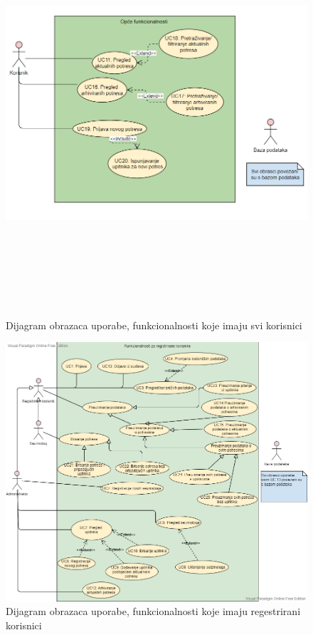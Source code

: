 				\begin{figure}[H]
					\includegraphics[width=\textwidth, height = 15cm]{slike/prvinovi.PNG} 
					 \caption{Dijagram obrazaca uporabe, funkcionalnosti koje imaju svi korisnici}
					  \label{fig:obrasci1} 
				  \end{figure}
				  
				  \begin{figure}[H]
					\includegraphics[width=\textwidth]{slike/druginovi.PNG} 
					\caption{Dijagram obrazaca uporabe, funkcionalnosti koje imaju regestrirani korisnici}
					\label{fig:obrasci2} 
				   \end{figure}
				\eject		
				
